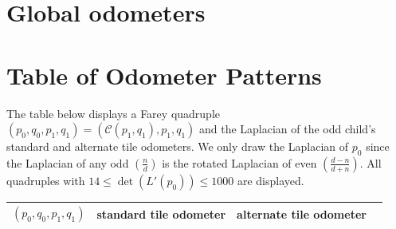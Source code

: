 \documentclass[12pt]{amsart}
\begin{document}
\section{Global odometers} \label{sec:global_odometers}



	
	 
	 
	 

	
	
	

	
	
	\appendix
	
	\section{Table of Odometer Patterns}
	
The table below displays a Farey quadruple $(p_0,q_0, p_1,q_1) = (\mathcal{C}(p_1, q_1), p_1,q_1)$ and the Laplacian of the odd child's standard and alternate tile odometers. We only draw the Laplacian of $p_0$ since the Laplacian of any odd $(\frac{n}{d})$ is the rotated Laplacian of even $(\frac{d-n}{d+n})$. All quadruples with $14 \leq \det(L'(p_0)) \leq 1000$ are displayed. 

\setlength{\tabcolsep}{2pt}
\begin{longtable}[c]{rcc}
	\hline
	$(p_0,q_0,p_1,q_1)$  \hspace{1 em} & standard tile odometer \hspace{1 em} &  alternate tile odometer
	\ \\
	\hline
	

\end{longtable}
	
	
	
	
	
	
	
	
\end{document}
